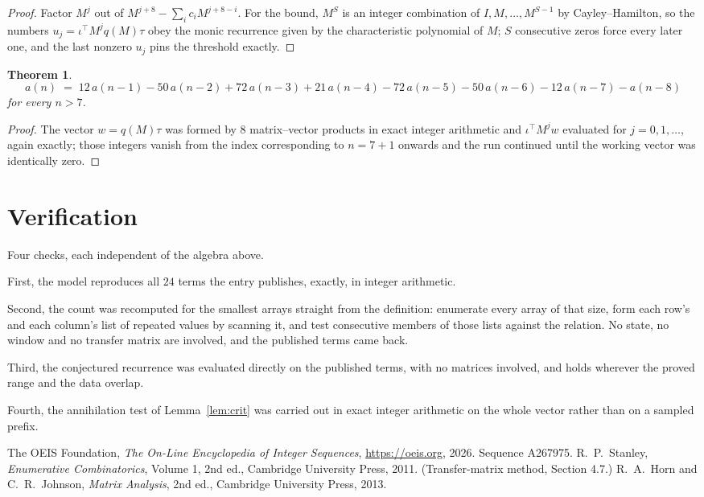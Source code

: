 \documentclass[11pt,a4paper]{article}
\theoremstyle{plain}
\newtheorem{theorem}{Theorem}
\theoremstyle{definition}
\begin{document}
\begin{proof}
Factor $M^{j}$ out of $M^{j+8}-\sum_ic_iM^{j+8-i}$. For the bound, $M^{S}$
is an integer combination of $I,M,\dots,M^{S-1}$ by Cayley--Hamilton, so the numbers
$u_j=\iota^{\!\top}M^{j}q(M)\tau$ obey the monic recurrence given by the characteristic
polynomial of $M$; $S$ consecutive zeros force every later one, and the last nonzero $u_j$
pins the threshold exactly.
\end{proof}

\begin{theorem}
\[
a(n)\;=\;12\,a(n-1) - 50\,a(n-2) + 72\,a(n-3) + 21\,a(n-4) - 72\,a(n-5) - 50\,a(n-6) - 12\,a(n-7) - a(n-8)
\]
for every $n>7$.
\end{theorem}

\begin{proof}
The vector $w=q(M)\tau$ was formed by $8$ matrix--vector products in exact integer
arithmetic and $\iota^{\!\top}M^{j}w$ evaluated for $j=0,1,\dots$, again exactly; those
integers vanish from the index corresponding to $n=7+1$ onwards and the run continued
until the working vector was identically zero.
\end{proof}

\section{Verification}

Four checks, each independent of the algebra above.

First, the model reproduces all $24$ terms the entry publishes, exactly, in integer
arithmetic.

Second, the count was recomputed for the smallest arrays straight from the definition:
enumerate every array of that size, form each row's and each column's list of repeated values
by scanning it, and test consecutive members of those lists against the relation. No state, no
window and no transfer matrix are involved, and the published terms came back.

Third, the conjectured recurrence was evaluated directly on the published terms, with no
matrices involved, and holds wherever the proved range and the data overlap.

Fourth, the annihilation test of Lemma~\ref{lem:crit} was carried out in exact integer
arithmetic on the whole vector rather than on a sampled prefix.

\begin{thebibliography}{9}
 The OEIS Foundation, \emph{The On-Line Encyclopedia of Integer
Sequences}, \url{https://oeis.org}, 2026. Sequence A267975.
 R.~P.~Stanley, \emph{Enumerative Combinatorics}, Volume 1, 2nd ed.,
Cambridge University Press, 2011. (Transfer-matrix method, Section 4.7.)
 R.~A.~Horn and C.~R.~Johnson, \emph{Matrix Analysis}, 2nd ed., Cambridge
University Press, 2013.
\end{thebibliography}
\end{document}
